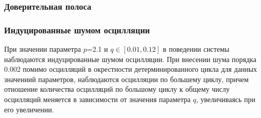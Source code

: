 \documentclass[slidestop,compress,mathserif]{beamer}
\begin{document}
\begin{frame}
\frametitle{Доверительная полоса}
\begin{figure}[h!]
\vspace{-1em}
\vspace{-2em}
\end{figure}
\end{frame}
\begin{frame}
\frametitle{Индуцированные шумом осцилляции}
\vspace{1em}
При значении параметра $p$=2.1 и $q\in[0.01, 0.12]$ в поведении системы наблюдаются индуцированные шумом осцилляции. При внесении шума порядка 0.002 помимо осцилляций в окрестности детерминированного цикла для данных значениий параметров, наблюдаются осцилляции по большему циклу, причем отношение количества осцилляций по большому циклу к общему числу осцилляций меняется в зависимости от значения параметра $q$, увеличиваясь при его увеличении.
\end{frame}
\end{document}
